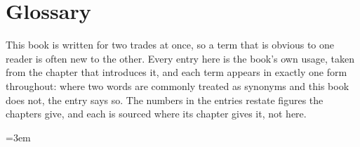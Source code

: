 \chapter*{Glossary}

This book is written for two trades at once, so a term that is obvious to
one reader is often new to the other. Every entry here is the book's own
usage, taken from the chapter that introduces it, and each term appears in
exactly one form throughout: where two words are commonly treated as
synonyms and this book does not, the entry says so. The numbers in the
entries restate figures the chapters give, and each is sourced where its
chapter gives it, not here.

\begingroup
\emergencystretch=3em
